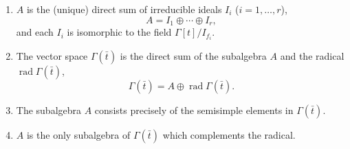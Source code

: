  
\begin{enumerate}
\item $A$ is the (unique) direct sum of irreducible ideals $I_i$ ($i = 1, \dots, r$),
  $$A = I_1 \oplus \cdots \oplus I_r,$$
  and each $I_i$ is isomorphic to the field $\Gamma[t] / I_{f_i}$.
\item The vector space $\Gamma(\bar{t})$ is the direct sum of the subalgebra $A$ and the radical $\operatorname{rad} \Gamma(\bar{t})$,
  $$\Gamma(\bar{t}) = A \oplus \operatorname{rad} \Gamma(\bar{t}).$$
\item The subalgebra $A$ consists precisely of the semisimple elements in $\Gamma(\bar{t})$.
\item $A$ is the only subalgebra of $\Gamma(\bar{t})$ which complements the radical.
\end{enumerate}
